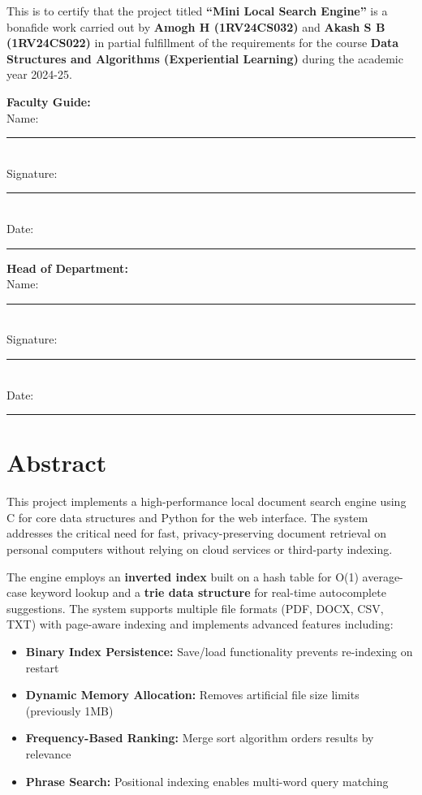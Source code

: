 \documentclass[12pt,a4paper]{article}
\begin{document}
This is to certify that the project titled \textbf{``Mini Local Search Engine''} is a bonafide work carried out by \textbf{Amogh H (1RV24CS032)} and \textbf{Akash S B (1RV24CS022)} in partial fulfillment of the requirements for the course \textbf{Data Structures and Algorithms (Experiential Learning)} during the academic year 2024-25.

\vspace{2cm}

\begin{flushleft}
\textbf{Faculty Guide:} \\[0.5cm]
Name: \rule{5cm}{0.4pt} \\[0.5cm]
Signature: \rule{5cm}{0.4pt} \\[0.5cm]
Date: \rule{5cm}{0.4pt}
\end{flushleft}

\vspace{1cm}

\begin{flushleft}
\textbf{Head of Department:} \\[0.5cm]
Name: \rule{5cm}{0.4pt} \\[0.5cm]
Signature: \rule{5cm}{0.4pt} \\[0.5cm]
Date: \rule{5cm}{0.4pt}
\end{flushleft}

\newpage
\section*{Abstract}

This project implements a high-performance local document search engine using C for core data structures and Python for the web interface. The system addresses the critical need for fast, privacy-preserving document retrieval on personal computers without relying on cloud services or third-party indexing.

The engine employs an \textbf{inverted index} built on a hash table for O(1) average-case keyword lookup and a \textbf{trie data structure} for real-time autocomplete suggestions. The system supports multiple file formats (PDF, DOCX, CSV, TXT) with page-aware indexing and implements advanced features including:

\begin{itemize}
    \item \textbf{Binary Index Persistence:} Save/load functionality prevents re-indexing on restart
    \item \textbf{Dynamic Memory Allocation:} Removes artificial file size limits (previously 1MB)
    \item \textbf{Frequency-Based Ranking:} Merge sort algorithm orders results by relevance
    \item \textbf{Phrase Search:} Positional indexing enables multi-word query matching
\end{itemize}
\end{document}
